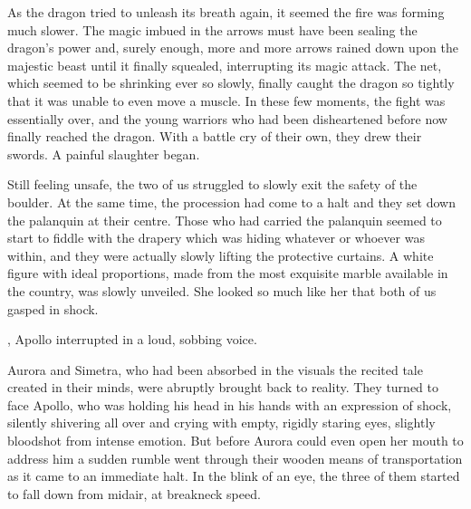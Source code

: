 As the dragon tried to unleash its breath again, it seemed the fire was forming much slower. The magic imbued in the arrows must have been sealing the dragon's power and, surely enough, more and more arrows rained down upon the majestic beast until it finally squealed, interrupting its magic attack. The net, which seemed to be shrinking ever so slowly, finally caught the dragon so tightly that it was unable to even move a muscle. In these few moments, the fight was essentially over, and the young warriors who had been disheartened before now finally reached the dragon. With a battle cry of their own, they drew their swords. A painful slaughter began.

Still feeling unsafe, the two of us struggled to slowly exit the safety of the boulder. At the same time, the procession had come to a halt and they set down the palanquin at their centre. Those who had carried the palanquin seemed to start to fiddle with the drapery which was hiding whatever or whoever was within, and they were actually slowly lifting the protective curtains. A white figure with ideal proportions, made from the most exquisite marble available in the country, was slowly unveiled. She looked so much like her that both of us gasped in shock.

\fancybreaker{}

, Apollo interrupted in a loud, sobbing voice. 

Aurora and Simetra, who had been absorbed in the visuals the recited tale created in their minds, were abruptly brought back to reality. They turned to face Apollo, who was holding his head in his hands with an expression of shock, silently shivering all over and crying with empty, rigidly staring eyes, slightly bloodshot from intense emotion. But before Aurora could even open her mouth to address him a sudden rumble went through their wooden means of transportation as it came to an immediate halt. In the blink of an eye, the three of them started to fall down from midair, at breakneck speed.
